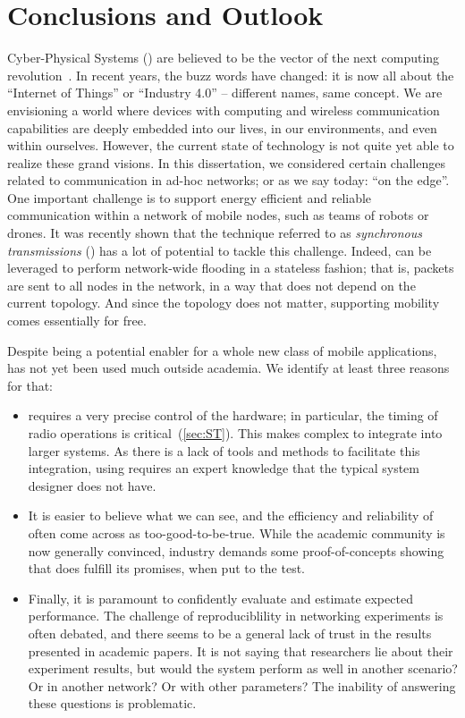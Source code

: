 
\chapter{Conclusions and Outlook}
\label{ch:conclusions}

Cyber-Physical Systems (\CPS) are believed to be the vector of the next computing revolution~\cite{rajkumar2010CPS}. In recent years, the buzz words have changed: it is now all about the ``Internet of Things'' or ``Industry 4.0'' -- different names, same concept.
We are envisioning a world where devices with computing and wireless communication capabilities are deeply embedded into our lives, in our environments, and even within ourselves.
However, the current state of technology is not quite yet able to realize these grand visions.
In this dissertation, we considered certain challenges related to communication in ad-hoc networks; or as we say today: ``on the edge''.
One important challenge is to support energy efficient and reliable communication within a network of mobile nodes, such as teams of robots or drones.
It was recently shown that the technique referred to as \emph{synchronous transmissions} (\ST) has a lot of potential to tackle this challenge.
Indeed, \ST can be leveraged to perform network-wide flooding in a stateless fashion; that is, packets are sent to all nodes in the network, in a way that does not depend on the current topology. And since the topology does not matter, supporting mobility comes essentially for free.


Despite being a potential enabler for a whole new class of mobile \CPS applications, \ST has not yet been used much outside academia. We identify at least three reasons for that:
\begin{itemize}

  \item
  \ST requires a very precise control of the hardware; in particular, the timing of radio operations is critical~(\cref{sec:ST}).
  This makes \ST complex to integrate into larger systems. As there is a lack of tools and methods to facilitate this integration, using \ST requires an expert knowledge that the typical system designer does not have.
  \item
  It is easier to believe what we can see, and the efficiency and reliability of \ST often come across as too-good-to-be-true. While the academic community is now generally convinced, industry demands some proof-of-concepts showing that \ST does fulfill its promises, when put to the test.
  \item
  Finally, it is paramount to confidently evaluate and estimate expected performance.
  The challenge of reproduciblility in networking experiments is often debated, and there seems to be a general lack of trust in the results presented in academic papers.
  It is not saying that researchers lie about their experiment results, but would the system perform as well in another scenario? Or in another network? Or with other parameters?
  The inability of answering these questions  is problematic.

\end{itemize}

